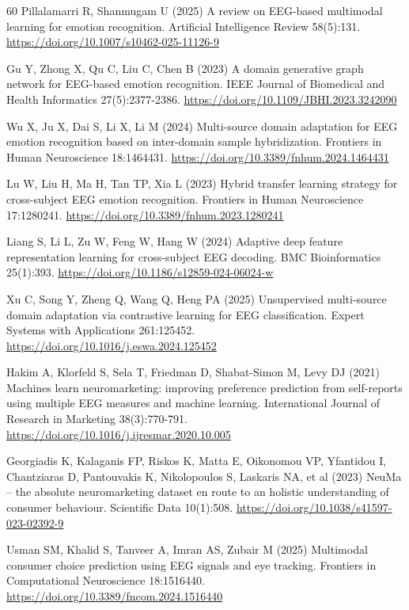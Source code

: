 \documentclass[pdflatex,sn-basic,Numbered,twocolumn,iicol]{sn-jnl}
\theoremstyle{thmstyleone}%
\theoremstyle{thmstyletwo}%
\theoremstyle{thmstylethree}%
\begin{document}
\begin{thebibliography}{60}
 Pillalamarri R, Shanmugam U (2025) A review on EEG-based multimodal learning for emotion recognition. Artificial Intelligence Review 58(5):131. \url{https://doi.org/10.1007/s10462-025-11126-9}

 Gu Y, Zhong X, Qu C, Liu C, Chen B (2023) A domain generative graph network for EEG-based emotion recognition. IEEE Journal of Biomedical and Health Informatics 27(5):2377-2386. \url{https://doi.org/10.1109/JBHI.2023.3242090}

 Wu X, Ju X, Dai S, Li X, Li M (2024) Multi-source domain adaptation for EEG emotion recognition based on inter-domain sample hybridization. Frontiers in Human Neuroscience 18:1464431. \url{https://doi.org/10.3389/fnhum.2024.1464431}

 Lu W, Liu H, Ma H, Tan TP, Xia L (2023) Hybrid transfer learning strategy for cross-subject EEG emotion recognition. Frontiers in Human Neuroscience 17:1280241. \url{https://doi.org/10.3389/fnhum.2023.1280241}

 Liang S, Li L, Zu W, Feng W, Hang W (2024) Adaptive deep feature representation learning for cross-subject EEG decoding. BMC Bioinformatics 25(1):393. \url{https://doi.org/10.1186/s12859-024-06024-w}

 Xu C, Song Y, Zheng Q, Wang Q, Heng PA (2025) Unsupervised multi-source domain adaptation via contrastive learning for EEG classification. Expert Systems with Applications 261:125452. \url{https://doi.org/10.1016/j.eswa.2024.125452}

 Hakim A, Klorfeld S, Sela T, Friedman D, Shabat-Simon M, Levy DJ (2021) Machines learn neuromarketing: improving preference prediction from self-reports using multiple EEG measures and machine learning. International Journal of Research in Marketing 38(3):770-791. \url{https://doi.org/10.1016/j.ijresmar.2020.10.005}

 Georgiadis K, Kalaganis FP, Riskos K, Matta E, Oikonomou VP, Yfantidou I, Chantziaras D, Pantouvakis K, Nikolopoulos S, Laskaris NA, et al (2023) NeuMa -- the absolute neuromarketing dataset en route to an holistic understanding of consumer behaviour. Scientific Data 10(1):508. \url{https://doi.org/10.1038/s41597-023-02392-9}

 Usman SM, Khalid S, Tanveer A, Imran AS, Zubair M (2025) Multimodal consumer choice prediction using EEG signals and eye tracking. Frontiers in Computational Neuroscience 18:1516440. \url{https://doi.org/10.3389/fncom.2024.1516440}


\end{thebibliography}
\end{document}
